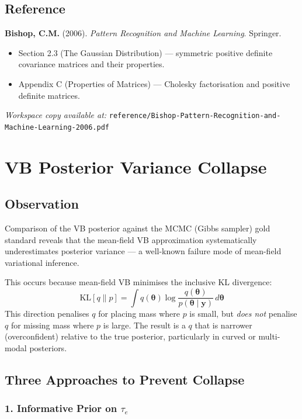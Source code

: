 \documentclass[11pt]{article}
\begin{document}
\subsection*{Reference}

\noindent\textbf{Bishop, C.M.} (2006). \textit{Pattern Recognition and Machine Learning}. Springer.
\begin{itemize}
  \item Section 2.3 (The Gaussian Distribution) --- symmetric positive definite covariance matrices and their properties.
  \item Appendix C (Properties of Matrices) --- Cholesky factorisation and positive definite matrices.
\end{itemize}
\noindent\textit{Workspace copy available at:} \texttt{reference/Bishop-Pattern-Recognition-and-Machine-Learning-2006.pdf}

\bigskip

\section*{VB Posterior Variance Collapse}

\subsection*{Observation}

Comparison of the VB posterior against the MCMC (Gibbs sampler) gold standard reveals that the mean-field VB approximation systematically underestimates posterior variance --- a well-known failure mode of mean-field variational inference.

This occurs because mean-field VB minimises the inclusive KL divergence:
\begin{equation}
  \mathrm{KL}[q \| p] = \int q(\bm{\theta}) \log \frac{q(\bm{\theta})}{p(\bm{\theta}\mid\bm{y})} \, d\bm{\theta}
\end{equation}
This direction penalises $q$ for placing mass where $p$ is small, but \emph{does not} penalise $q$ for missing mass where $p$ is large. The result is a $q$ that is narrower (overconfident) relative to the true posterior, particularly in curved or multi-modal posteriors.

\subsection*{Three Approaches to Prevent Collapse}

\subsubsection*{1. Informative Prior on $\tau_e$}
\end{document}
